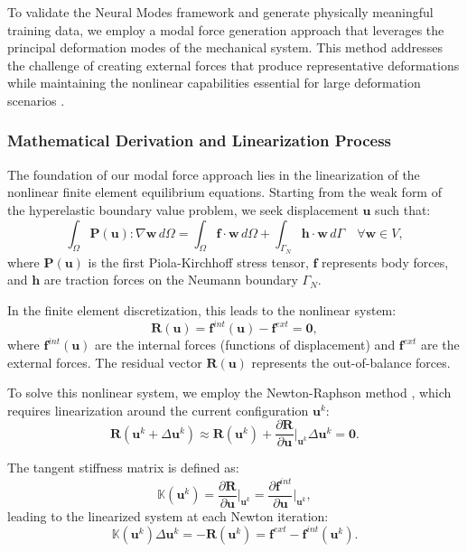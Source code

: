 To validate the Neural Modes framework and generate physically meaningful training data, we employ a modal force generation approach that leverages the principal deformation modes of the mechanical system. This method addresses the challenge of creating external forces that produce representative deformations while maintaining the nonlinear capabilities essential for large deformation scenarios \cite{odotDeepPhysicsPhysicsAware2021}.

\subsubsection{Mathematical Derivation and Linearization Process}

The foundation of our modal force approach lies in the linearization of the nonlinear finite element equilibrium equations. Starting from the weak form of the hyperelastic boundary value problem, we seek displacement $\bm{u}$ such that:
\begin{equation}
    \int_{\Omega} \bm{P}(\bm{u}) : \nabla \bm{w} \, d\Omega = \int_{\Omega} \bm{f} \cdot \bm{w} \, d\Omega + \int_{\Gamma_N} \bm{h} \cdot \bm{w} \, d\Gamma \quad \forall \bm{w} \in V,
\end{equation}
where $\bm{P}(\bm{u})$ is the first Piola-Kirchhoff stress tensor, $\bm{f}$ represents body forces, and $\bm{h}$ are traction forces on the Neumann boundary $\Gamma_N$.

In the finite element discretization, this leads to the nonlinear system:
\begin{equation}
    \bm{R}(\bm{u}) = \bm{f}^{int}(\bm{u}) - \bm{f}^{ext} = \bm{0},
\end{equation}
where $\bm{f}^{int}(\bm{u})$ are the internal forces (functions of displacement) and $\bm{f}^{ext}$ are the external forces. The residual vector $\bm{R}(\bm{u})$ represents the out-of-balance forces.

To solve this nonlinear system, we employ the Newton-Raphson method \cite{Dedieu_2015}, which requires linearization around the current configuration $\bm{u}^k$:
\begin{equation}
    \bm{R}(\bm{u}^k + \Delta\bm{u}^k) \approx \bm{R}(\bm{u}^k) + \frac{\partial \bm{R}}{\partial \bm{u}}\bigg|_{\bm{u}^k} \Delta\bm{u}^k = \bm{0}.
\end{equation}

The tangent stiffness matrix is defined as:
\begin{equation}
    \mathbb{K}(\bm{u}^k) = \frac{\partial \bm{R}}{\partial \bm{u}}\bigg|_{\bm{u}^k} = \frac{\partial \bm{f}^{int}}{\partial \bm{u}}\bigg|_{\bm{u}^k},
\end{equation}
leading to the linearized system at each Newton iteration:
\begin{equation}
    \mathbb{K}(\bm{u}^k) \Delta\bm{u}^k = -\bm{R}(\bm{u}^k) = \bm{f}^{ext} - \bm{f}^{int}(\bm{u}^k).
\end{equation}

